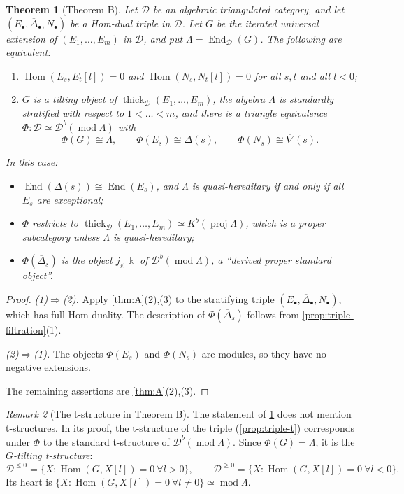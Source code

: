 \documentclass[11pt,reqno]{amsart}
\theoremstyle{plain}
\newtheorem{theorem}{Theorem}[section]
\theoremstyle{definition}
\theoremstyle{remark}
\newtheorem{remark}[theorem]{Remark}
\newcommand{\kk}{\Bbbk}
\DeclareMathOperator{\Hom}{Hom}
\DeclareMathOperator{\End}{End}
\newcommand{\modd}{\operatorname{mod}}
\newcommand{\proj}{\operatorname{proj}}
\newcommand{\Db}{\mathcal{D}^b}
\newcommand{\Kb}{K^b}
\newcommand{\thick}[2][\cD]{\operatorname{thick}_{#1}(#2)}
\newcommand{\nablabar}{\overline{\nabla}}
\newcommand{\Deltabar}{\overline{\Delta}}
\newcommand{\cD}{\mathcal{D}}
\begin{document}
\begin{theorem}[Theorem B]\label{thm:B}
Let $\cD$ be an algebraic triangulated category, and let $(E_\bullet,\Deltabar_\bullet,N_\bullet)$ be a Hom-dual triple in $\cD$. Let $G$ be the iterated universal extension of $(E_1,\dots,E_m)$ in $\cD$, and put $\Lambda=\End_\cD(G)$. The following are equivalent:
\begin{enumerate}
\item $\Hom(E_s,E_t[l])=0$ and $\Hom(N_s,N_t[l])=0$ for all $s,t$ and all $l<0$;
\item $G$ is a tilting object of $\thick{E_1,\dots,E_m}$, the algebra $\Lambda$ is standardly stratified with respect to $1<\dots<m$, and there is a triangle equivalence $\Phi\colon\cD\simeq\Db(\modd\Lambda)$ with
\[\Phi(G)\cong\Lambda,\qquad\Phi(E_s)\cong\Delta(s),\qquad\Phi(N_s)\cong\nablabar(s).\]
\end{enumerate}
In this case:
\begin{itemize}
\item $\End(\Delta(s))\cong\End(E_s)$, and $\Lambda$ is quasi-hereditary if and only if all $E_s$ are exceptional;
\item $\Phi$ restricts to $\thick{E_1,\dots,E_m}\simeq\Kb(\proj\Lambda)$, which is a proper subcategory unless $\Lambda$ is quasi-hereditary;
\item $\Phi(\Deltabar_s)$ is the object $j_{s!}\kk$ of $\Db(\modd\Lambda)$, a ``derived proper standard object''.
\end{itemize}
\end{theorem}

\begin{proof}
\emph{(1)$\Rightarrow$(2).} Apply \cref{thm:A}(2),(3) to the stratifying triple $(E_\bullet,\Deltabar_\bullet,N_\bullet)$, which has full Hom-duality. The description of $\Phi(\Deltabar_s)$ follows from \cref{prop:triple-filtration}(1).

\emph{(2)$\Rightarrow$(1).} The objects $\Phi(E_s)$ and $\Phi(N_s)$ are modules, so they have no negative extensions.

The remaining assertions are \cref{thm:A}(2),(3).
\end{proof}

\begin{remark}[The t-structure in Theorem B]\label{rem:G-tilting}
The statement of \cref{thm:B} does not mention t-structures. In its proof, the t-structure of the triple (\cref{prop:triple-t}) corresponds under $\Phi$ to the standard t-structure of $\Db(\modd\Lambda)$. Since $\Phi(G)=\Lambda$, it is the \emph{$G$-tilting t-structure}:
\[\cD^{\le0}=\{X:\Hom(G,X[l])=0\ \forall l>0\},\qquad\cD^{\ge0}=\{X:\Hom(G,X[l])=0\ \forall l<0\}.\]
Its heart is $\{X:\Hom(G,X[l])=0\ \forall l\ne0\}\simeq\modd\Lambda$.
\end{remark}
\end{document}
